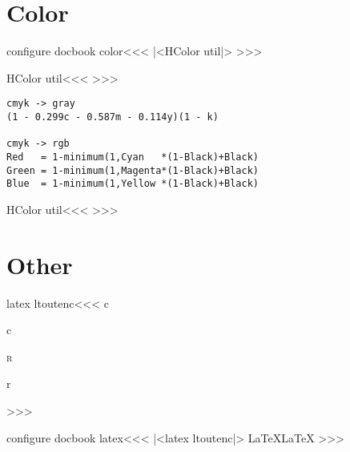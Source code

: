 \section{Color}


\<configure docbook color\><<<
|<HColor util|>
>>>


\<HColor util\><<<
\def\int:of#1#2#3{%
   \tmp:dim=#3pt \tmp:dim=#2\tmp:dim
   \edef\:temp{\tmp:cnt\the\tmp:dim//}%
   \def#1##1//{}\afterassignment#1\:temp
   \edef#1{\the\tmp:cnt}%
}
>>>


\begin{verbatim}
cmyk -> gray
(1 - 0.299c - 0.587m - 0.114y)(1 - k) 

cmyk -> rgb
Red   = 1-minimum(1,Cyan   *(1-Black)+Black)
Green = 1-minimum(1,Magenta*(1-Black)+Black)
Blue  = 1-minimum(1,Yellow *(1-Black)+Black)
\end{verbatim}



\<HColor util\><<<
\def\:cmyk#1#2{%
   \tmp:cnt=255 \advance\tmp:cnt by -\:Black
   \multiply\tmp:cnt by#2 \advance\tmp:cnt by \:Black 
   \advance\tmp:cnt by -255 \tmp:cnt=-\tmp:cnt
   \ifnum \tmp:cnt<0 \tmp:cnt=0 \fi
   \edef#1{\the\tmp:cnt}%
}
>>>






\section{Other}


\<latex ltoutenc\><<<
   {\@use@text@encoding \@curr@enc c}       
   {\leavevmode {}c}
   {\@use@text@encoding \@curr@enc \scshape r}
   {\leavevmode {}r}
   {}
>>>


\<configure docbook latex\><<<
|<latex ltoutenc|>
\def\:temp{LaTeX}
\HLet\LaTeX\:temp
>>>

